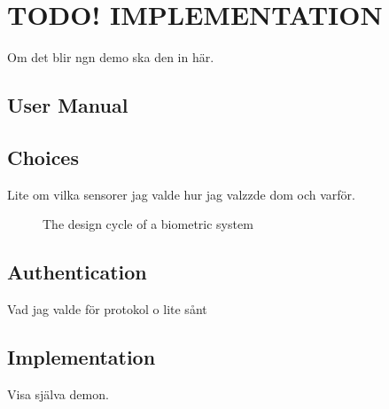 \chapter{\textbf{TODO! }IMPLEMENTATION}\label{cha:demo}
Om det blir ngn demo ska den in här.

\section{User Manual}\label{manual}

\section{Choices}
Lite om vilka sensorer jag valde hur jag valzzde dom och varför.
\begin{figure}[!ht]
	
	\caption{\label{fig:appDesign} The design cycle of a biometric system}
\end{figure}

\section{Authentication}
Vad jag valde för protokol o lite sånt

\section{Implementation}
Visa själva demon.
